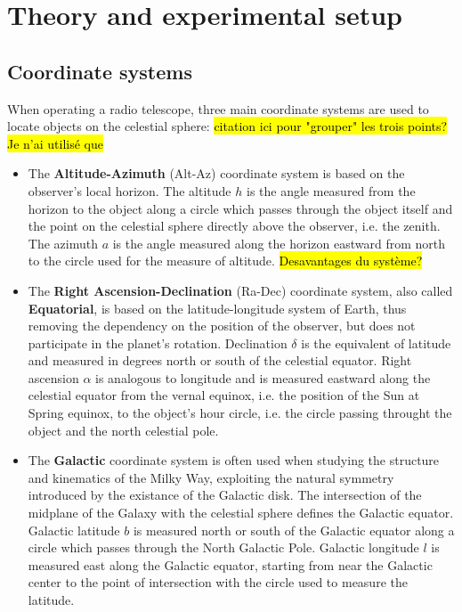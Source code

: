 \section{Theory and experimental setup}
\subsection{Coordinate systems}
When operating a radio telescope, three main coordinate systems are used to locate objects on the celestial sphere: \hl{citation ici pour "grouper" les trois points? Je n'ai utilisé que} \cite{carroll_introduction_2007}
\begin{itemize}
    \item The \textbf{Altitude-Azimuth} (Alt-Az) coordinate system is based on the observer's local horizon. The altitude $h$ is the angle measured from the horizon to the object along a circle which passes through the object itself and the point on the celestial sphere directly above the observer, i.e. the zenith. The azimuth $a$ is the angle measured along the horizon eastward from north to the circle used for the measure of altitude. \hl{Desavantages du système?} \cite{carroll_introduction_2007}
    \item The \textbf{Right Ascension-Declination} (Ra-Dec) coordinate system, also called \textbf{Equatorial}, is based on the latitude-longitude system of Earth, thus removing the dependency on the position of the observer, but does not participate in the planet's rotation. Declination $\delta$ is the equivalent of latitude and measured in degrees north or south of the celestial equator. Right ascension $\alpha$ is analogous to longitude and is measured eastward along the celestial equator from the vernal equinox, i.e. the position of the Sun at Spring equinox, to the object's hour circle, i.e. the circle passing throught the object and the north celestial pole.
    \item The \textbf{Galactic} coordinate system is often used when studying the structure and kinematics of the Milky Way, exploiting the natural symmetry introduced by the existance of the Galactic disk. The intersection of the midplane of the Galaxy with the celestial sphere defines the Galactic equator. Galactic latitude $b$ is measured north or south of the Galactic equator along a circle which passes through the North Galactic Pole. Galactic longitude $l$ is measured east along the Galactic equator, starting from near the Galactic center to the point of intersection with the circle used to measure the latitude.
\end{itemize}
